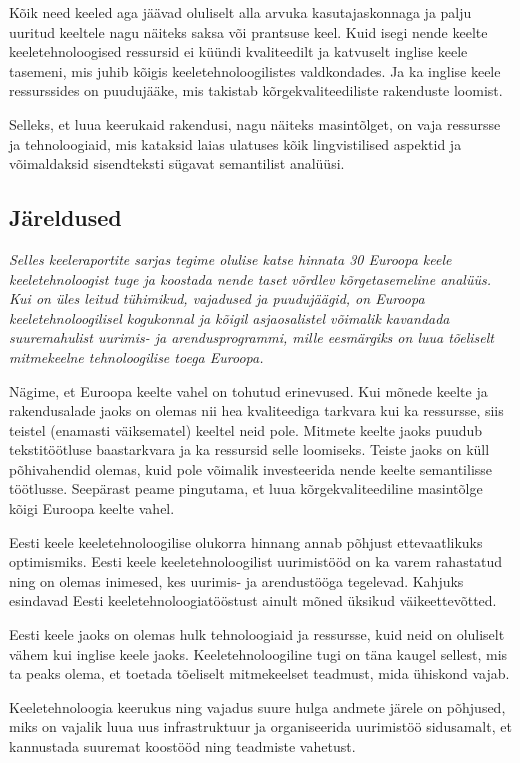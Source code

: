 \documentclass[]{../metanetpaper}
\begin{document}
\begin{multicols}{2}
Kõik need keeled aga jäävad oluliselt alla arvuka kasutajaskonnaga ja palju uuritud keeltele nagu näiteks saksa või prantsuse keel.
Kuid isegi nende keelte keeletehnoloogised ressursid ei küündi kvaliteedilt ja katvuselt inglise keele tasemeni, mis juhib kõigis keeletehnoloogilistes valdkondades.
Ja ka inglise keele ressurssides on puudujääke, mis takistab kõrgekvaliteediliste rakenduste loomist.

Selleks, et luua keerukaid rakendusi, nagu näiteks masintõlget, on vaja ressursse ja tehnoloogiaid, mis kataksid laias ulatuses kõik lingvistilised aspektid ja võimaldaksid sisendteksti sügavat semantilist analüüsi.

\subsection{Järeldused}

\emph{Selles keeleraportite sarjas tegime olulise katse hinnata 30 Euroopa keele keeletehnoloogist tuge ja koostada nende taset võrdlev kõrgetasemeline analüüs.
Kui on üles leitud tühimikud, vajadused ja puudujäägid, on Euroopa keeletehnoloogilisel kogukonnal ja kõigil asja\-osalistel võimalik kavandada suuremahulist uurimis- ja arendusprogrammi, mille eesmärgiks on luua tõeliselt mitmekeelne tehnoloogilise toega Euroopa.}


Nägime, et Euroopa keelte vahel on tohutud erinevused. 
Kui mõnede keelte ja rakendusalade jaoks on olemas nii hea kvaliteediga tarkvara kui ka ressursse, siis teistel (enamasti väiksematel) keeltel neid pole. 
Mitmete keelte jaoks puudub tekstitöötluse baastarkvara ja ka ressursid selle loomiseks. 
Teiste jaoks on küll põhivahendid olemas, kuid pole võimalik investeerida nende keelte semantilisse töötlusse. 
Seepärast peame pingutama, et luua kõrgekvaliteediline masintõlge kõigi Euroopa keelte vahel. 

Eesti keele keeletehnoloogilise olukorra hinnang annab põhjust ettevaatlikuks optimismiks. 
Eesti keele keeletehnoloogilist uurimistööd on ka varem rahastatud ning on olemas inimesed, kes uurimis- ja arendustööga tegelevad. 
Kahjuks esindavad Eesti keeletehnoloogiatööstust ainult mõned üksikud väikeettevõtted.

Eesti keele jaoks on olemas hulk tehnoloogiaid ja ressursse, kuid neid on oluliselt vähem kui inglise keele jaoks. 
Keeletehnoloogiline tugi on täna kaugel sellest, mis ta peaks olema, et toetada tõeliselt mitmekeelset teadmust, mida ühiskond vajab.

Keeletehnoloogia keerukus ning vajadus suure hulga andmete järele on põhjused, miks on vajalik luua uus infrastruktuur ja organiseerida uurimistöö sidusamalt, et kannustada suuremat koostööd ning teadmiste vahetust.


\end{multicols}
\end{document}
